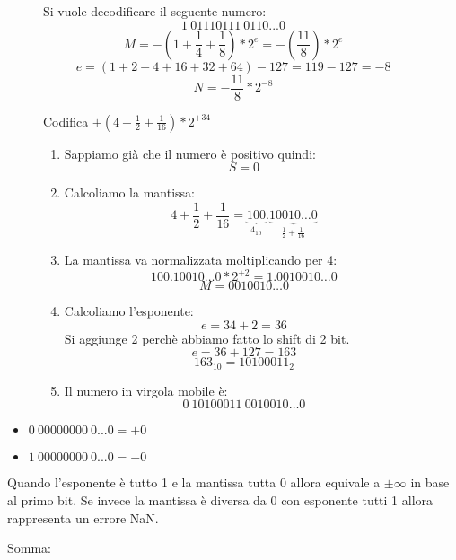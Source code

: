 \documentclass[a4paper]{article}
\theoremstyle{break}
\theoremstyle{break}
\theoremstyle{break}
\theoremstyle{break}
\begin{document}
\begin{figure}[H]
	\begin{example}
		Si vuole decodificare il seguente numero:
		\[1\:01110111\:0110...0\]
		\[M = -(1+\frac{1}{4}+\frac{1}{8})*2^e = -(\frac{11}{8})*2^{e}\]
		\[e = (1+2+4+16+32+64)-127=119-127=-8\]
		\[N = -\frac{11}{8} * 2^{-8}\]
	\end{example}
\end{figure}

\begin{figure}[H]
	\begin{example}
		Codifica $+(4+\frac{1}{2}+\frac{1}{16})*2^{+34}$
		\begin{enumerate}
			\item Sappiamo già che il numero è positivo quindi:
			      \[
				      S=0
			      \]
			\item Calcoliamo la mantissa:
			      \[
				      4+\frac{1}{2}+\frac{1}{16}= \underbrace{100}_{4_{10}}.
				      \underbrace{10010 \ldots 0}_{\frac{1}{2}+\frac{1}{16}}
			      \]
			\item La mantissa va normalizzata moltiplicando per 4:
			      \[
				      100.10010 \ldots 0 * 2^{+2} = 1.0010010 \ldots 0
			      \]
			      \[
				      M = 0010010 \ldots 0
			      \]
			\item Calcoliamo l'esponente:
                \[
                e = 34 + 2 = 36
                \] Si aggiunge 2 perchè abbiamo fatto lo shift di 2 bit.
                \[
                e = 36 + 127 = 163
                \] 
                \[
                    163_{10} = 10100011_2
                \] 
                \item Il numero in virgola mobile è:
                \[
                    0\:10100011\:0010010 \ldots 0
                \]
		\end{enumerate}
	\end{example}
\end{figure}

\begin{itemize}
	\item $0\:00000000\:0...0 = +0$
	\item $1\:00000000\:0...0 = -0$
\end{itemize}

Quando l'esponente è tutto 1 e la mantissa tutta 0 allora equivale a \( \pm \infty \)
in base al primo bit. Se invece la mantissa è diversa da 0 con esponente tutti 1
allora rappresenta un errore NaN.

Somma:\\
\label{es2}
\end{document}
